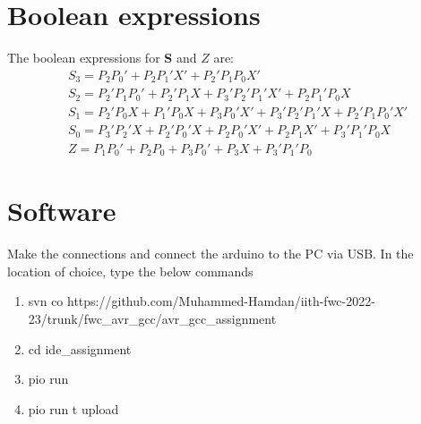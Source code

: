 \documentclass[journal,10pt,twocolumn]{article}
\begin{document}
\section*{\large Boolean expressions}
The boolean expressions for \textbf{S} and $Z$ are:
\begin{align*} %
&S_3 = P_2P_0' + P_2P_1'X' + P_2'P_1P_0X'\\
&S_2 = P_2'P_1P_0' + P_2'P_1X + P_3'P_2'P_1'X' + P_2P_1'P_0X\\
&S_1 = P_2'P_0X + P_1'P_0X + P_3P_0'X' + P_3'P_2'P_1'X + P_2'P_1P_0'X'\\
&S_0 = P_3'P_2'X + P_2'P_0'X + P_2P_0'X' + P_2P_1X' + P_3'P_1'P_0X\\
&Z = P_1P_0' + P_2P_0 + P_3P_0' + P_3X + P_3'P_1'P_0
\end{align*}

\section*{\large Software}
Make the connections and connect the arduino to the PC via USB. In the location of choice, type the below commands
\begin{enumerate}
\item svn co https://github.com/Muhammed-Hamdan/iith-fwc-2022-23/trunk/fwc\_avr\_gcc/avr\_gcc\_assignment
\item cd ide\_assignment
\item pio run
\item pio run \-t upload
\end{enumerate}
\end{document}
